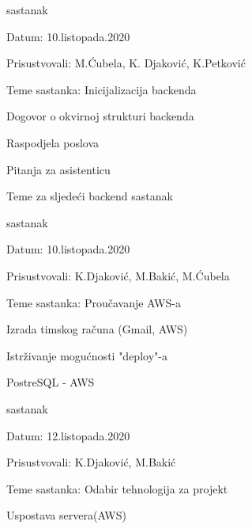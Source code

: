 \begin{packed_enum}
				
			\item  sastanak
			\item[] \begin{packed_item}
				\item Datum: 10.listopada.2020
				\item Prisustvovali:  M.Ćubela, K. Djaković, K.Petković
				\item Teme sastanka: Inicijalizacija backenda
				\begin{packed_item}
					\item Dogovor o okvirnoj strukturi backenda
					\item Raspodjela poslova
					\item Pitanja za asistenticu
					\item Teme za sljedeći backend sastanak
				\end{packed_item}
			\end{packed_item}
			
			
			
			
			\item  sastanak
			\item[] \begin{packed_item}
				\item Datum: 10.listopada.2020
				\item Prisustvovali: K.Djaković, M.Bakić, M.Ćubela
				\item Teme sastanka: Proučavanje AWS-a
				\begin{packed_item}
					\item Izrada timskog računa (Gmail, AWS)
					\item Istrživanje mogućnosti "deploy"-a
					\item PostreSQL - AWS
				\end{packed_item}
			\end{packed_item}
			
			
			\item  sastanak
			\item[] \begin{packed_item}
				\item Datum: 12.listopada.2020
				\item Prisustvovali:  K.Djaković, M.Bakić
				\item Teme sastanka: Odabir tehnologija za projekt
				\begin{packed_item}
					\item Uspostava servera(AWS)
				\end{packed_item}
			\end{packed_item}
			

\end{packed_enum}
